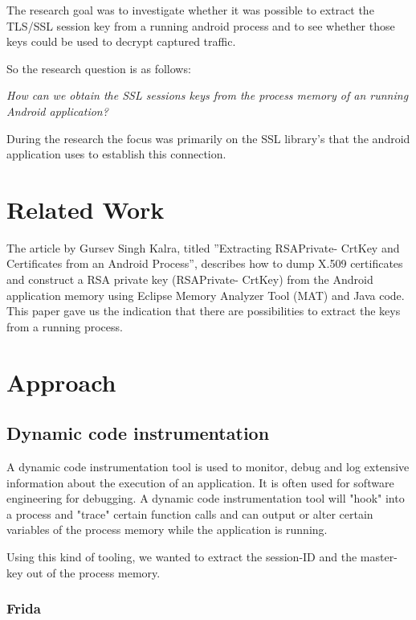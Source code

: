 \documentclass[12pt, a4paper]{report}
\begin{document}
The research goal was to investigate whether it was possible to extract the TLS/SSL session key from a running android process and to see whether those keys could be used to decrypt captured traffic. 

So the research question is as follows:

\begin{framed}
\noindent \textit{How can we obtain the SSL sessions keys from the process memory of an running Android application?}
\end{framed}

During the research the focus was primarily on the SSL library's that the android application uses to establish this connection.

\chapter{Related Work}
The article by Gursev Singh Kalra, titled ”Extracting RSAPrivate-
CrtKey and Certificates from an Android Process”, describes how to
dump X.509 certificates and construct a RSA private key (RSAPrivate-
CrtKey) from the Android application memory using Eclipse Memory
Analyzer Tool (MAT) and Java code. This paper gave us the indication that there are possibilities to extract the keys from a running
process.\cite{ref1}

\chapter{Approach}
\section{Dynamic code instrumentation}

A dynamic code instrumentation tool is used to monitor, debug and log extensive information about the execution of an application. It is often used for software engineering for debugging. A dynamic code instrumentation tool will "hook" into a process and "trace" certain function calls and can output or alter certain variables of the process memory while the application is running.

Using this kind of tooling, we wanted to extract the session-ID and the master-key out of the process memory. 

\subsection{Frida}
\end{document}
